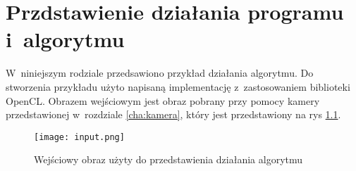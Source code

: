 \chapter{Przdstawienie działania programu i~algorytmu}
\label{cha:dzialanie}

W~niniejszym rodziale przedsawiono przykład działania algorytmu. Do stworzenia przykładu użyto napisaną implementację z~zastosowaniem biblioteki OpenCL. Obrazem wejściowym jest obraz pobrany przy pomocy kamery przedstawionej w~rozdziale \ref{cha:kamera}, który jest przedstawiony na rys \ref{fig:input}.

\begin{figure}
\begin{center}
\texttt{[image: input.png]}
\end{center}
\caption{Wejściowy obraz użyty do przedstawienia działania algorytmu}
\label{fig:input}
\end{figure}

